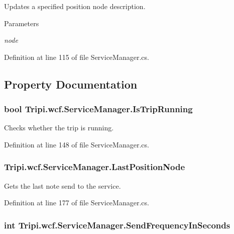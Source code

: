 Updates a specified position node description. 
\begin{DoxyParams}{Parameters}
\item[{\em node}]\end{DoxyParams}


Definition at line 115 of file ServiceManager.cs.

\subsection{Property Documentation}
\hypertarget{class_tripi_1_1wcf_1_1_service_manager_ab41e53f9ef7bd367f2b07a21be60b069}{
\subsubsection[{IsTripRunning}]{\setlength{\rightskip}{0pt plus 5cm}bool Tripi.wcf.ServiceManager.IsTripRunning}}
\label{class_tripi_1_1wcf_1_1_service_manager_ab41e53f9ef7bd367f2b07a21be60b069}


Checks whether the trip is running. 

Definition at line 148 of file ServiceManager.cs.\hypertarget{class_tripi_1_1wcf_1_1_service_manager_a239da270c1ca481e3819a50a13060438}{
\subsubsection[{LastPositionNode}]{ Tripi.wcf.ServiceManager.LastPositionNode}}
\label{class_tripi_1_1wcf_1_1_service_manager_a239da270c1ca481e3819a50a13060438}


Gets the last note send to the service. 

Definition at line 177 of file ServiceManager.cs.\hypertarget{class_tripi_1_1wcf_1_1_service_manager_afa562f56d741a45b14d83b6acb1f1c66}{
\subsubsection[{SendFrequencyInSeconds}]{\setlength{\rightskip}{0pt plus 5cm}int Tripi.wcf.ServiceManager.SendFrequencyInSeconds}}
\label{class_tripi_1_1wcf_1_1_service_manager_afa562f56d741a45b14d83b6acb1f1c66}


